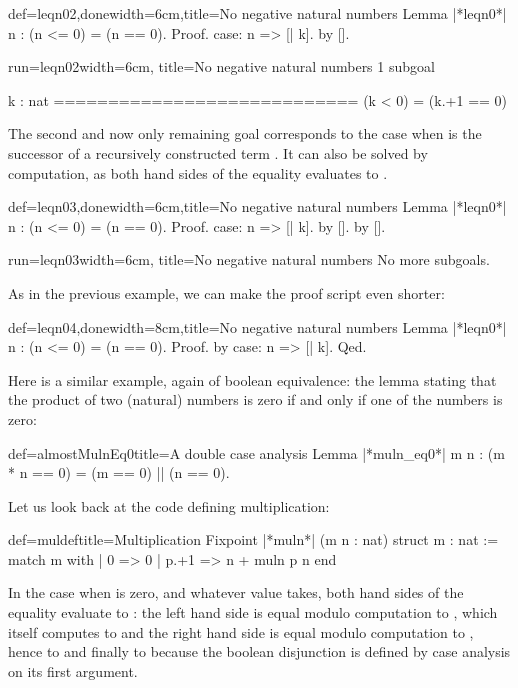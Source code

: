 \begin{coq}{def=leqn02,done}{width=6cm,title=No negative natural numbers}
Lemma |*leqn0*| n : (n <= 0) = (n == 0).
Proof.
case: n => [| k].
  by [].
\end{coq}
\begin{coqout}{run=leqn02}{width=6cm, title=No negative natural numbers}
1 subgoal

  k : nat
  ============================
   (k < 0) = (k.+1 == 0)
\end{coqout}
The second and now only remaining goal corresponds to the case when
 is the successor  of a recursively constructed term
.
It can also be  solved by computation, as both hand sides
of the equality evaluates to .

\begin{coq}{def=leqn03,done}{width=6cm,title=No negative natural numbers}
Lemma |*leqn0*| n : (n <= 0) = (n == 0).
Proof.
case: n => [| k].
  by [].
by [].
\end{coq}
\begin{coqout}{run=leqn03}{width=6cm, title=No negative natural numbers}
  No more subgoals.
\end{coqout}
As in the previous example, we can make the proof script even shorter:

\begin{coq}{def=leqn04,done}{width=8cm,title=No negative natural numbers}
Lemma |*leqn0*| n : (n <= 0) = (n == 0).
Proof.
by case: n => [| k].
Qed.
\end{coq}

Here is a similar example, again of boolean equivalence: the lemma
stating that the product of two (natural) numbers is zero if and only
if one of the numbers is zero:

\begin{coq}{def=almostMulnEq0}{title=A double case analysis}
Lemma |*muln_eq0*| m n : (m * n == 0) = (m == 0) || (n == 0).
\end{coq}

Let us look back at the code defining multiplication:

\begin{coq}{def=muldef}{title=Multiplication}
Fixpoint |*muln*| (m n : nat) {struct m} : nat :=
  match m with
  | 0 => 0
  | p.+1 => n + muln p n
  end
\end{coq}
In the case when  is zero, and whatever value  takes, both
hand sides of the equality evaluate to : the left hand side is
equal modulo computation to , which itself computes to
 and the right hand side is equal modulo computation to
, hence to  and finally to
 because the boolean disjunction \C{(_ || _)} is defined by
case analysis on its first argument.

